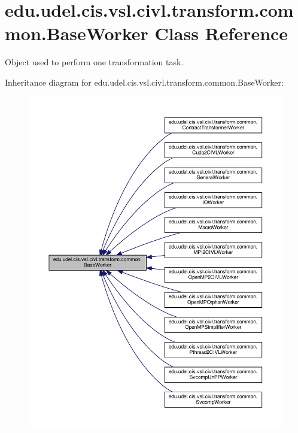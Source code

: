 \hypertarget{classedu_1_1udel_1_1cis_1_1vsl_1_1civl_1_1transform_1_1common_1_1BaseWorker}{}\section{edu.\+udel.\+cis.\+vsl.\+civl.\+transform.\+common.\+Base\+Worker Class Reference}
\label{classedu_1_1udel_1_1cis_1_1vsl_1_1civl_1_1transform_1_1common_1_1BaseWorker}


Object used to perform one transformation task.  




Inheritance diagram for edu.\+udel.\+cis.\+vsl.\+civl.\+transform.\+common.\+Base\+Worker\+:
\nopagebreak
\begin{figure}[H]
\begin{center}
\leavevmode
\includegraphics[width=350pt]{classedu_1_1udel_1_1cis_1_1vsl_1_1civl_1_1transform_1_1common_1_1BaseWorker__inherit__graph}
\end{center}
\end{figure}


